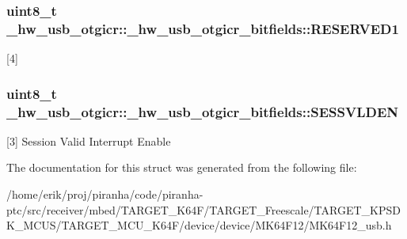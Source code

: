 \subsubsection[{\texorpdfstring{R\+E\+S\+E\+R\+V\+E\+D1}{RESERVED1}}]{\setlength{\rightskip}{0pt plus 5cm}uint8\+\_\+t \+\_\+hw\+\_\+usb\+\_\+otgicr\+::\+\_\+hw\+\_\+usb\+\_\+otgicr\+\_\+bitfields\+::\+R\+E\+S\+E\+R\+V\+E\+D1}\hypertarget{struct__hw__usb__otgicr_1_1__hw__usb__otgicr__bitfields_a1e18335ad059272a3d62d0116e13ba09}{}\label{struct__hw__usb__otgicr_1_1__hw__usb__otgicr__bitfields_a1e18335ad059272a3d62d0116e13ba09}
\mbox{[}4\mbox{]} 
\subsubsection[{\texorpdfstring{S\+E\+S\+S\+V\+L\+D\+EN}{SESSVLDEN}}]{\setlength{\rightskip}{0pt plus 5cm}uint8\+\_\+t \+\_\+hw\+\_\+usb\+\_\+otgicr\+::\+\_\+hw\+\_\+usb\+\_\+otgicr\+\_\+bitfields\+::\+S\+E\+S\+S\+V\+L\+D\+EN}\hypertarget{struct__hw__usb__otgicr_1_1__hw__usb__otgicr__bitfields_acd17296e86837afdd7925965b6eed5e6}{}\label{struct__hw__usb__otgicr_1_1__hw__usb__otgicr__bitfields_acd17296e86837afdd7925965b6eed5e6}
\mbox{[}3\mbox{]} Session Valid Interrupt Enable 

The documentation for this struct was generated from the following file\+:\begin{DoxyCompactItemize}
\item 
/home/erik/proj/piranha/code/piranha-\/ptc/src/receiver/mbed/\+T\+A\+R\+G\+E\+T\+\_\+\+K64\+F/\+T\+A\+R\+G\+E\+T\+\_\+\+Freescale/\+T\+A\+R\+G\+E\+T\+\_\+\+K\+P\+S\+D\+K\+\_\+\+M\+C\+U\+S/\+T\+A\+R\+G\+E\+T\+\_\+\+M\+C\+U\+\_\+\+K64\+F/device/device/\+M\+K64\+F12/M\+K64\+F12\+\_\+usb.\+h\end{DoxyCompactItemize}

